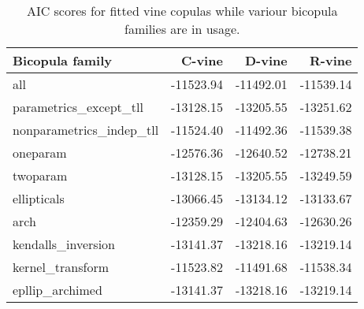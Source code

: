 \begin{table}[H]

\caption{AIC scores for fitted vine copulas while variour bicopula families are in usage.}
\centering
\fontsize{11}{13}\selectfont
\begin{tabular}[t]{lrrr}
\toprule
Bicopula family & C-vine & D-vine & R-vine\\
\midrule
all & -11523.94 & -11492.01 & -11539.14\\
parametrics\_except\_tll & -13128.15 & -13205.55 & -13251.62\\
nonparametrics\_indep\_tll & -11524.40 & -11492.36 & -11539.38\\
oneparam & -12576.36 & -12640.52 & -12738.21\\
twoparam & -13128.15 & -13205.55 & -13249.59\\
ellipticals & -13066.45 & -13134.12 & -13133.67\\
arch & -12359.29 & -12404.63 & -12630.26\\
kendalls\_inversion & -13141.37 & -13218.16 & -13219.14\\
kernel\_transform & -11523.82 & -11491.68 & -11538.34\\
epllip\_archimed & -13141.37 & -13218.16 & -13219.14\\
\bottomrule
\end{tabular}
\end{table}
